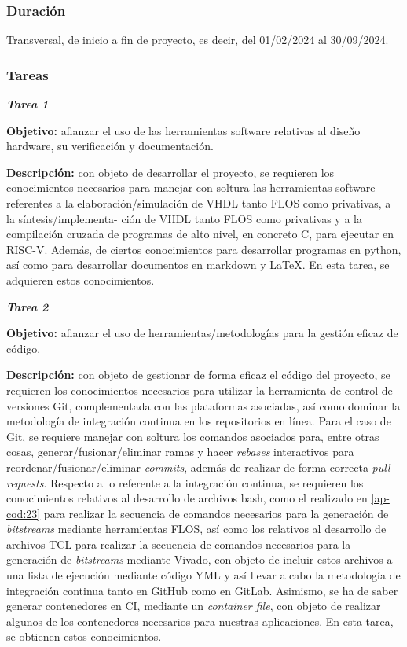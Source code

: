 \subsubsection{Duración}

Transversal, de inicio a fin de proyecto, es decir, del 01/02/2024 al 30/09/2024.

\subsubsection{Tareas}

\noindent \textbf{\textit{Tarea 1}}

\textbf{Objetivo:} afianzar el uso de las herramientas software relativas al diseño hardware, su verificación y documentación. 

\textbf{Descripción:} con objeto de desarrollar el proyecto, se requieren los conocimientos necesarios para manejar con soltura las herramientas software referentes a la elaboración/simulación de VHDL tanto FLOS como privativas, a la síntesis/implementa- ción de VHDL tanto FLOS como privativas y a la compilación cruzada de programas de alto nivel, en concreto C, para ejecutar en RISC-V. 
Además, de ciertos conocimientos para desarrollar programas en python, así como para desarrollar documentos en markdown y \LaTeX.
En esta tarea, se adquieren estos conocimientos.


\noindent \textbf{\textit{Tarea 2}}

\textbf{Objetivo:} afianzar el uso de herramientas/metodologías para la gestión eficaz de código. 

\textbf{Descripción:} con objeto de gestionar de forma eficaz el código del proyecto, se requieren los conocimientos necesarios para utilizar la herramienta de control de versiones Git, complementada con las plataformas asociadas, así como dominar la metodología de integración continua en los repositorios en línea.
Para el caso de Git, se requiere manejar con soltura los comandos asociados para, entre otras cosas, generar/fusionar/eliminar ramas y hacer \textit{rebases} interactivos para reordenar/fusionar/eliminar \textit{commits}, además de realizar de forma correcta \textit{pull requests}.
Respecto a lo referente a la integración continua, se requieren los conocimientos relativos al desarrollo de archivos bash, como el realizado en \ref{ap-cod:23} para realizar la secuencia de comandos necesarios para la generación de \textit{bitstreams} mediante herramientas FLOS, así como los relativos al desarrollo de archivos TCL para realizar la secuencia de comandos necesarios para la generación de \textit{bitstreams} mediante Vivado, con objeto de incluir estos archivos a una lista de ejecución mediante código YML y así llevar a cabo la metodología de integración continua tanto en GitHub como en GitLab.
Asimismo, se ha de saber generar contenedores en CI, mediante un \textit{container file}, con objeto de realizar algunos de los contenedores necesarios para nuestras aplicaciones. 
En esta tarea, se obtienen estos conocimientos.

